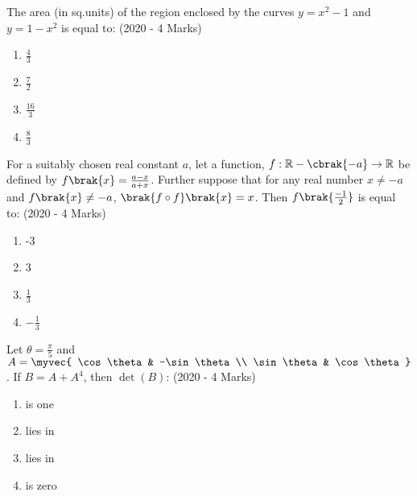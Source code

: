    \item{
            The area (in sq.units) of the region enclosed by the curves $y = x^2-1$ and $y = 1-x^2$ is equal to:
             \hfill
                {(2020 - 4 Marks)}
            \begin{multicols}{4}
                \begin{enumerate}
                    \item $\frac{4}{3}$
                   	\item $\frac{7}{2}$
                   	\item $\frac{16}{3}$
                    \item $\frac{8}{3}$
                \end{enumerate}
            \end{multicols}
        
        }
    \item{
            For a suitably chosen real constant $a$, let a function, $f: \mathbb{R} - \cbrak{-a} \rightarrow \mathbb{R}$ be defined by $f\brak{x} = \frac{a-x}{a+x}$. Further suppose that for any real number $x \neq -a$ and $f\brak{x} \neq -a$, $\brak{f \circ f}\brak{x} = x$. Then $f\brak{\frac{-1}{2}}$ is equal to:
             \hfill
                {(2020 - 4 Marks)}
			\begin{multicols}{4}
				\begin{enumerate}
					\item -3
					\item 3
					\item $\frac{1}{3}$
					\item $-\frac{1}{3}$
				\end{enumerate}
			\end{multicols}
        
        }
    \item{
        
            Let $\theta = \frac{\pi}{5}$ and $A = \myvec{ \cos\theta & -\sin\theta \\ \sin\theta & \cos\theta}$. If $B = A + A^4$, then $\det(B)$:
             \text{   }\hfill
                {(2020 - 4 Marks)}
            \begin{multicols}{2}
                \begin{enumerate}
                   	\item is one
                    \item lies in 
                    \item lies in 
                    \item is zero
                \end{enumerate}
            \end{multicols}
        
        }
